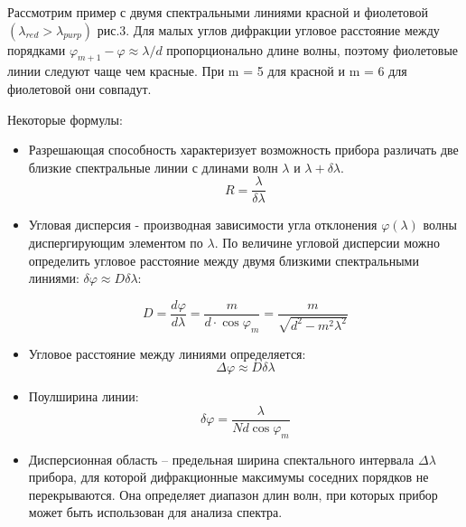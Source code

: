 \documentclass[a4paper]{article}
\begin{document}
Рассмотрим пример с двумя спектральными линиями красной и фиолетовой $(\lambda_{red}> \lambda_{purp})$ рис.3. Для малых углов дифракции угловое расстояние между порядками $\varphi_{m+1} - \varphi \approx \lambda /d$ пропорционально длине волны, поэтому фиолетовые линии следуют чаще чем красные. При m = 5 для красной и m = 6 для фиолетовой они совпадут. \par 

Некоторые формулы:

\begin{itemize}
    \item Разрешающая способность характеризует возможность прибора различать две близкие спектральные линии с длинами волн $\lambda$ и $\lambda + \delta \lambda$.
    \begin{equation}
        R = \frac{\lambda}{\delta \lambda}
    \end{equation}

    \item Угловая дисперсия - производная зависимости угла отклонения $\varphi(\lambda)$ волны диспергирующим элементом по $\lambda$. По величине угловой дисперсии можно определить угловое расстояние между двумя близкими спектральными линиями: $\delta \varphi \approx D \delta \lambda$:

    \begin{equation}
        D = \frac{d \varphi}{d \lambda} = \frac{m}{d \cdot \cos{\varphi_m}} = \frac{m}{\sqrt{d^2 - m^2 \lambda^2}}
    \end{equation}

    \item Угловое расстояние между линиями определяется:
    \begin{equation}
        \Delta \varphi \approx D \delta \lambda
    \end{equation}

    \item Поулширина линии:
    \begin{equation}
        \delta \varphi = \frac{\lambda}{Nd \cos{\varphi_m}}
    \end{equation}

    \item Дисперсионная область – предельная ширина спектального интервала $\Delta \lambda$ прибора, для которой дифракционные максимумы соседних порядков не перекрываются. Она определяет диапазон длин волн, при которых прибор может быть использован для анализа спектра.

\end{itemize}
\end{document}
